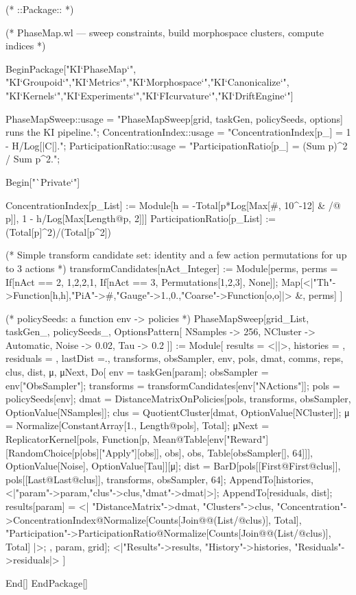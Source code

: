 (* ::Package:: *)

(* PhaseMap.wl — sweep constraints, build morphospace clusters, compute indices *)

BeginPackage["KI`PhaseMap`",
  {"KI`Groupoid`","KI`Metrics`","KI`Morphospace`","KI`Canonicalize`",
   "KI`Kernels`","KI`Experiments`","KI`FIcurvature`","KI`DriftEngine`"}]

PhaseMapSweep::usage = "PhaseMapSweep[grid, taskGen, policySeeds, options] runs the KI pipeline.";
ConcentrationIndex::usage = "ConcentrationIndex[p_] = 1 - H/Log[|C|].";
ParticipationRatio::usage = "ParticipationRatio[p_] = (Sum p)^2 / Sum p^2.";

Begin["`Private`"]

ConcentrationIndex[p_List] := Module[{h = -Total[p*Log[Max[#, 10^-12] & /@ p]]}, 1 - h/Log[Max[Length@p, 2]]]
ParticipationRatio[p_List] := (Total[p]^2)/(Total[p^2])

(* Simple transform candidate set: identity and a few action permutations for up to 3 actions *)
transformCandidates[nAct_Integer] := Module[{perms},
  perms = If[nAct == 2, {{1,2},{2,1}}, If[nAct == 3, Permutations[{1,2,3}], {None}]];
  Map[<|"Th"->Function[h,h],"PiA"->#,"Gauge"->{1.,0.},"Coarse"->Function[o,o]|> &, perms]
]

(* policySeeds: a function env -> {policies} *)
PhaseMapSweep[grid_List, taskGen_, policySeeds_, OptionsPattern[{
    NSamples -> 256, NCluster -> Automatic, Noise -> 0.02, Tau -> 0.2
}]] := Module[
  {results = <||>, histories = {}, residuals = {}, lastDist =., transforms, obsSampler, env, pols, dmat, comms, reps, clus, dist, μ, μNext},
  Do[
    env = taskGen[param];
    obsSampler = env["ObsSampler"];
    transforms = transformCandidates[env["NActions"]];
    pols = policySeeds[env];
    dmat = DistanceMatrixOnPolicies[pols, transforms, obsSampler, OptionValue[NSamples]];
    clus = QuotientCluster[dmat, OptionValue[NCluster]];
    μ = Normalize[ConstantArray[1., Length@pols], Total];
    μNext = ReplicatorKernel[pols, Function[p, Mean@Table[env["Reward"][RandomChoice[p[obs]["Apply"][obs]], obs], {obs, Table[obsSampler[], 64]}]], OptionValue[Noise], OptionValue[Tau]][μ];
    dist = BarD[pols[[First@First@clus]], pols[[Last@Last@clus]], transforms, obsSampler, 64];
    AppendTo[histories, <|"param"->param,"clus"->clus,"dmat"->dmat|>];
    AppendTo[residuals, dist];
    results[param] = <|
      "DistanceMatrix"->dmat,
      "Clusters"->clus,
      "Concentration"->ConcentrationIndex@Normalize[Counts[Join@@(List/@clus)], Total],
      "Participation"->ParticipationRatio@Normalize[Counts[Join@@(List/@clus)], Total]
    |>;
    , {param, grid}];
  <|"Results"->results, "History"->histories, "Residuals"->residuals|>
]

End[]
EndPackage[]